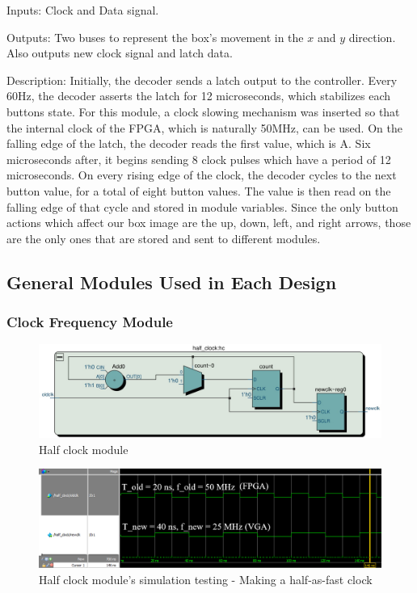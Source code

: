 \documentclass[12pt]{article}
\numberwithin{figure}{subsection}
\begin{document}
Inputs: Clock and Data signal.

Outputs: Two buses to represent the box’s movement in the $x$ and $y$ direction. Also outputs new clock signal and latch data.

Description: Initially, the decoder sends a latch output to the controller. Every 60Hz, the decoder asserts the latch for 12 microseconds, which stabilizes each buttons state. For this module, a clock slowing mechanism was inserted so that the internal clock of the FPGA, which is naturally 50MHz, can be used. On the falling edge of the latch, the decoder reads the first value, which is A. Six microseconds after, it begins sending 8 clock pulses which have a period of 12 microseconds. On every rising edge of the clock, the decoder cycles to the next button value, for a total of eight button values. The value is then read on the falling edge of that cycle and stored in module variables. Since the only button actions which affect our box image are the up, down, left, and right arrows, those are the only ones that are stored and sent to different modules.

\subsection{General Modules Used in Each Design}

\subsubsection{Clock Frequency Module}

\begin{figure}[ht]
  \centering
  \includegraphics[width=\textwidth]{half_clock.jpg}
  \caption{Half clock module}
  \label{fig:half_clock}
\end{figure}

\begin{figure}[ht]
  \centering
  \includegraphics[width=\textwidth]{half_clock_simulation.png}
  \caption{Half clock module’s simulation testing - Making a half-as-fast clock}
  \label{fig:half_clock_simulation}
\end{figure}
\end{document}
